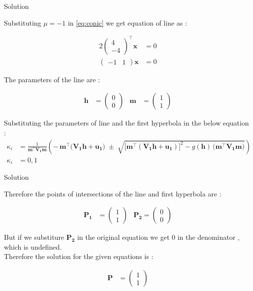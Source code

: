 \documentclass{beamer}
\numberwithin{equation}{section}
\theoremstyle{remark}
\newcommand{\myvec}[1]{\ensuremath{\begin{pmatrix}#1\end{pmatrix}}}
\let\vec\mathbf
\begin{document}
\begin{frame}{Solution}

Substituting $\mu = -1$ in \eqref{eq:conic} we get equation of line as :

\begin{align}
  2\myvec{4 \\-4}^\top\vec{x} &= 0\\
  \myvec{-1 & 1}\vec{x} &= 0
\end{align}

The parameters of the line are :

\begin{align}
  \vec{h} &= \myvec{0\\0} & \vec{m} &= \myvec{1\\1}
\end{align}

Substituting the parameters of line and the first hyperbola in the below equation :
\begin{align}
\kappa_i
  &= \frac{1}{\vec{m}^\top \vec{V_1}\vec{m}}
     \left(
       -\,\vec{m}^\top\big(\vec{V_1}\vec{h}+\vec{u_1}\big)
       \;\pm\;
       \sqrt{ \big[\vec{m}^\top(\vec{V_1}\vec{h}+\vec{u_1})\big]^2
       - g(\vec{h})\,\big(\vec{m}^\top \vec{V_1}\vec{m}\big)}
     \right)\\
  \kappa_i &= 0,1
\end{align}

\end{frame}

\begin{frame}{Solution}

Therefore the points of intersections of the line and first hyperbola are :

\begin{align}
  \vec{P_1}&=\myvec{1\\1} & \vec{P_2} = \myvec{0\\0}
\end{align}

But if we substiture $\vec{P_2}$ in the original equation we get 0 in the denominator , which is undefined.\\
Therefore the solution for the given equations is :

\begin{align}
  \vec{P} &= \myvec{1\\1}
\end{align}

\end{frame}
\end{document}
